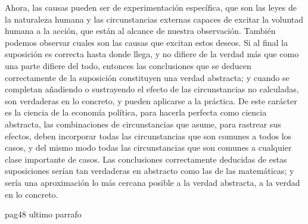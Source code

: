 Ahora, las causas pueden ser de experimentación específica, que son las leyes de la naturaleza humana y las circunstancias externas capaces de excitar la voluntad humana a la acción, que están al alcance de nuestra observación. También podemos observar cuales son las causas que excitan estos deseos. Si al final la suposición es correcta hasta donde llega, y no difiere de la verdad más que como una parte difiere del todo, entonces las conclusiones que se deducen correctamente de la suposición constituyen una verdad abstracta; y cuando se completan añadiendo o sustrayendo el efecto de las circunstancias no calculadas, son verdaderas en lo concreto, y pueden aplicarse a la práctica. De este carácter es la ciencia de la economía política, para hacerla perfecta como ciencia abstracta, las combinaciones de circunstancias que asume, para rastrear sus efectos, deben incorporar todas las circunstancias que son comunes a todos los casos, y del mismo modo todas las circunstancias que son comunes a cualquier clase importante de casos. Las conclusiones correctamente deducidas de estas suposiciones serían tan verdaderas en abstracto como las de las matemáticas; y sería una aproximación lo más cercana posible a la verdad abstracta, a la verdad en lo concreto.

pag48 ultimo parrafo



